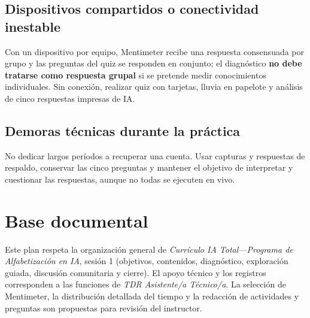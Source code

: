 \documentclass[11pt,a4paper]{article}
\begin{document}
\subsection*{Dispositivos compartidos o conectividad inestable}
Con un dispositivo por equipo, Mentimeter recibe una respuesta consensuada por grupo y las preguntas del quiz se responden en conjunto; el diagnóstico \textbf{no debe tratarse como respuesta grupal} si se pretende medir conocimientos individuales. Sin conexión, realizar quiz con tarjetas, lluvia en papelote y análisis de cinco respuestas impresas de IA.

\subsection*{Demoras técnicas durante la práctica}
No dedicar largos períodos a recuperar una cuenta. Usar capturas y respuestas de respaldo, conservar las cinco preguntas y mantener el objetivo de interpretar y cuestionar las respuestas, aunque no todas se ejecuten en vivo.

\section*{Base documental}
Este plan respeta la organización general de \emph{Currículo IA Total---Programa de Alfabetización en IA}, sesión 1 (objetivos, contenidos, diagnóstico, exploración guiada, discusión comunitaria y cierre). El apoyo técnico y los registros corresponden a las funciones de \emph{TDR Asistente/a Técnico/a}. La selección de Mentimeter, la distribución detallada del tiempo y la redacción de actividades y preguntas son propuestas para revisión del instructor.
\end{document}
